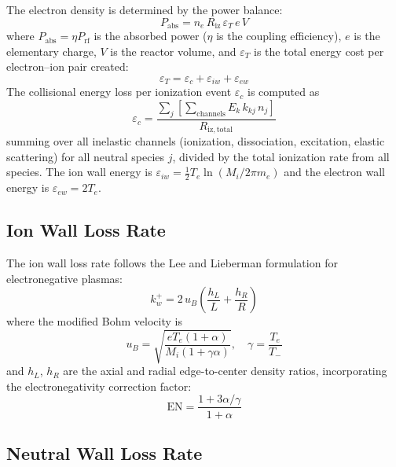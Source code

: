 \documentclass[11pt,a4paper]{article}
\newcommand{\Te}{T_e}
\newcommand{\ne}{n_e}
\begin{document}
The electron density is determined by the power balance:
\begin{equation}
P_\mathrm{abs} = \ne\, R_\mathrm{iz}\, \varepsilon_T\, e\, V
\label{eq:power_balance}
\end{equation}
where $P_\mathrm{abs} = \eta P_\mathrm{rf}$ is the absorbed power ($\eta$ is the coupling efficiency), $e$ is the elementary charge, $V$ is the reactor volume, and $\varepsilon_T$ is the total energy cost per electron--ion pair created:
\begin{equation}
\varepsilon_T = \varepsilon_c + \varepsilon_{iw} + \varepsilon_{ew}
\end{equation}
The collisional energy loss per ionization event $\varepsilon_c$ is computed as
\begin{equation}
\varepsilon_c = \frac{\displaystyle\sum_j \left[ \sum_{\text{channels}} E_k\, k_{kj}\, n_j \right]}{R_\mathrm{iz,total}}
\label{eq:Ec}
\end{equation}
summing over all inelastic channels (ionization, dissociation, excitation, elastic scattering) for all neutral species $j$, divided by the total ionization rate from all species.  The ion wall energy is $\varepsilon_{iw} = \frac{1}{2}\Te \ln(M_i / 2\pi m_e)$ and the electron wall energy is $\varepsilon_{ew} = 2\Te$.

\subsection{Ion Wall Loss Rate}

The ion wall loss rate follows the Lee and Lieberman formulation for electronegative plasmas:
\begin{equation}
k_w^+ = 2\, u_B \left( \frac{h_L}{L} + \frac{h_R}{R} \right)
\end{equation}
where the modified Bohm velocity is
\begin{equation}
u_B = \sqrt{\frac{e\Te(1+\alpha)}{M_i(1+\gamma\alpha)}}, \quad \gamma = \frac{\Te}{T_-}
\end{equation}
and $h_L$, $h_R$ are the axial and radial edge-to-center density ratios, incorporating the electronegativity correction factor:
\begin{equation}
\mathrm{EN} = \frac{1 + 3\alpha/\gamma}{1 + \alpha}
\end{equation}

\subsection{Neutral Wall Loss Rate}
\end{document}
